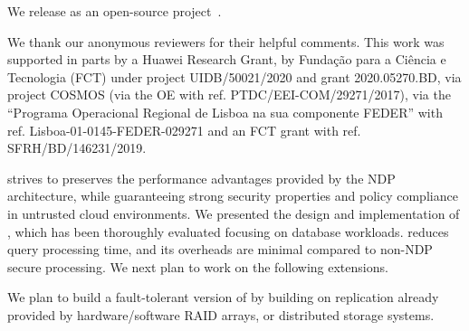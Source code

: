  We release \project{} as an open-source project~\cite{ironsafe-code}.

We thank our anonymous reviewers for their helpful comments.
This work was supported in parts by a Huawei Research Grant, by Fundação para a Ciência e Tecnologia (FCT) under project UIDB/50021/2020 and grant 2020.05270.BD, via project COSMOS (via the OE with ref. PTDC/EEI-COM/29271/2017), via the ``Programa Operacional Regional de Lisboa na sua componente FEDER'' with ref. Lisboa-01-0145-FEDER-029271 and an FCT grant with ref. SFRH/BD/146231/2019.

\project
strives to preserves the performance advantages provided by the NDP architecture, while guaranteeing strong security properties and policy compliance in untrusted cloud environments.
%
We presented the design and implementation of \project{}, which has been thoroughly evaluated focusing on database workloads.
\project reduces query processing time,  %
and its overheads are minimal compared to non-NDP secure processing. 
%
%
%
We next plan to work on the following extensions.

 We plan to build a fault-tolerant version of \project{} by building on replication already provided by hardware/software RAID arrays, or distributed storage systems. %


